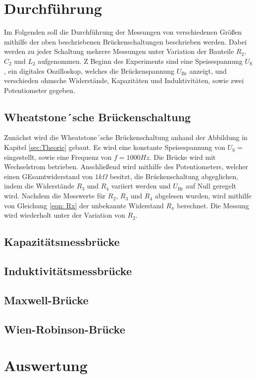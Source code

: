 \section{Durchführung} \label{sec:Durchführung}

    Im Folgenden soll die Durchführung der Messungen von verschiedenen Größen mithilfe der oben beschriebenen
    Brückenschaltungen beschrieben werden.
    Dabei werden zu jeder Schaltung mehrere Messungen unter Variation der Bauteile
    $R_2$, $C_2$ und $L_2$ aufgenommen.
    Z Beginn des Experiments sind eine Speisespannung $U_\text{S}$, ein digitales Oszilloskop, welches die 
    Brückenspannung $U_\text{Br}$ anzeigt, und verschieden ohmsche Widerstände, Kapazitäten und Induktivitäten, sowie
    zwei Potentiometer gegeben.

\subsection{Wheatstone´sche Brückenschaltung}

    Zunächst wird die Wheatstone´sche Brückenschaltung anhand der Abbildung in Kapitel \ref{sec:Theorie} gebaut.
    Es wird eine konstante Speisespannung von $U_\text{S} = $ eingestellt, sowie eine Frequenz von $f = 1000Hz$.
    Die Brücke wird mit Wechselstrom betrieben.
    Anschließend wird mithilfe des Potentiometers, welcher einen GEsamtwiderstand von $1k\Omega$ besitzt,
    die Brückenschaltung abgeglichen, indem 
    die Widerstände $R_3$ und $R_4$ variiert werden und $U_\text{Br}$ auf Null geregelt wird.
    Nachdem die Messwerte für $R_2$, $R_3$ und $R_4$ abgelesen wurden, wird mithilfe von Gleichung \eqref{eqn: Rx} 
    der unbekannte Widerstand $R_x$ berechnet.
    Die Messung wird wiederholt unter der Variation von $R_2$. 


\subsection{Kapazitätsmessbrücke}
\subsection{Induktivitätsmessbrücke}
\subsection{Maxwell-Brücke}
\subsection{Wien-Robinson-Brücke}

\section{Auswertung} \label{sec:Auswertung}
        


